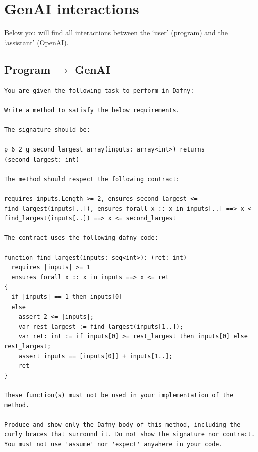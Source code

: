 \documentclass{article}
\begin{document}
\section*{GenAI interactions}
Below you will find all interactions between the `user' (program) and the `assistant' (OpenAI).
\subsection*{Program $\rightarrow$ GenAI}
\begin{lstlisting}
You are given the following task to perform in Dafny:

Write a method to satisfy the below requirements.

The signature should be:

p_6_2_g_second_largest_array(inputs: array<int>) returns (second_largest: int)

The method should respect the following contract:

requires inputs.Length >= 2, ensures second_largest <= find_largest(inputs[..]), ensures forall x :: x in inputs[..] ==> x < find_largest(inputs[..]) ==> x <= second_largest

The contract uses the following dafny code:

function find_largest(inputs: seq<int>): (ret: int)
  requires |inputs| >= 1
  ensures forall x :: x in inputs ==> x <= ret
{
  if |inputs| == 1 then inputs[0]
  else 
    assert 2 <= |inputs|;
    var rest_largest := find_largest(inputs[1..]);
    var ret: int := if inputs[0] >= rest_largest then inputs[0] else rest_largest;
    assert inputs == [inputs[0]] + inputs[1..]; 
    ret 
} 

These function(s) must not be used in your implementation of the method.

Produce and show only the Dafny body of this method, including the curly braces that surround it. Do not show the signature nor contract. You must not use 'assume' nor 'expect' anywhere in your code.
\end{lstlisting}
\end{document}
